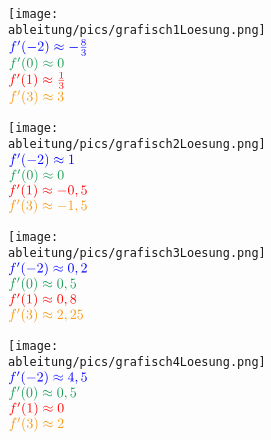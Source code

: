 \begin{Answer}[ref=grafischABlA1]\\
	\begin{minipage}{\textwidth}
		\begin{minipage}{0.5\textwidth}
			\centering\texttt{[image: \\ableitung/pics/grafisch1Loesung.png]}\\
			\(\textcolor{blue}{f'(-2)\approx-\frac{8}{3}}\)\\
			\(\textcolor{ForestGreen}{f'(0)\approx0}\)\\
			\(\textcolor{red}{f'(1)\approx\frac{1}{3}}\)\\
			\(\textcolor{YellowOrange}{f'(3)\approx 3}\)\\
		\end{minipage}%
		\begin{minipage}{0.5\textwidth}
			\centering\texttt{[image: \\ableitung/pics/grafisch2Loesung.png]}\\
			\(\textcolor{blue}{f'(-2)\approx1}\)\\
			\(\textcolor{ForestGreen}{f'(0)\approx0}\)\\
			\(\textcolor{red}{f'(1)\approx-0,5}\)\\
			\(\textcolor{YellowOrange}{f'(3)\approx-1,5}\)\\
		\end{minipage}%
	\end{minipage}%


	\begin{minipage}{\textwidth}
		\begin{minipage}{0.5\textwidth}
			\centering\texttt{[image: \\ableitung/pics/grafisch3Loesung.png]}\\
			\(\textcolor{blue}{f'(-2)\approx0,2}\)\\
			\(\textcolor{ForestGreen}{f'(0)\approx0,5}\)\\
			\(\textcolor{red}{f'(1)\approx0,8}\)\\
			\(\textcolor{YellowOrange}{f'(3)\approx2,25}\)\\
		\end{minipage}%
		\begin{minipage}{0.5\textwidth}
			\centering\texttt{[image: \\ableitung/pics/grafisch4Loesung.png]}\\
			\(\textcolor{blue}{f'(-2)\approx4,5}\)\\
			\(\textcolor{ForestGreen}{f'(0)\approx0,5}\)\\
			\(\textcolor{red}{f'(1)\approx0}\)\\
			\(\textcolor{YellowOrange}{f'(3)\approx2}\)\\
		\end{minipage}%
	\end{minipage}%
\end{Answer}